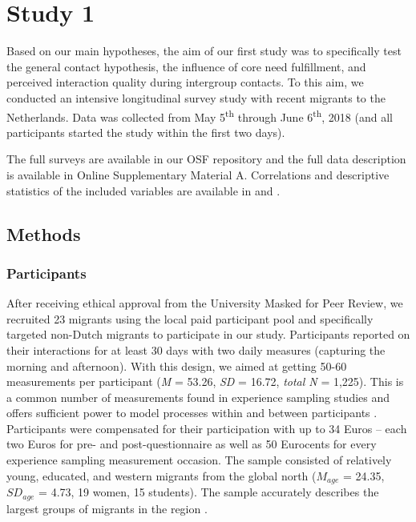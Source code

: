 \section{Study 1}

Based on our main hypotheses, the aim of our first study was to
specifically test the general contact hypothesis, the influence of core
need fulfillment, and perceived interaction quality during intergroup
contacts. To this aim, we conducted an intensive longitudinal survey
study with recent migrants to the Netherlands. Data was collected from
May 5\textsuperscript{th} through June 6\textsuperscript{th}, 2018 (and
all participants started the study within the first two days).

The full surveys are available in our OSF repository
\citep{KreienkampMasked2022a} and the full data description is available
in Online Supplementary Material A. Correlations and descriptive
statistics of the included variables are available in
 and .

\subsection{Methods}

\subsubsection{Participants}

After receiving ethical approval from the University Masked for Peer
Review, we recruited 23 migrants using the local paid participant pool
and specifically targeted non-Dutch migrants to participate in our
study. Participants reported on their interactions for at least 30 days
with two daily measures (capturing the morning and afternoon). With this
design, we aimed at getting 50-60 measurements per participant
(\textit{M} = 53.26, \textit{SD} = 16.72, \textit{total N} = 1,225).
This is a common number of measurements found in experience sampling
studies and offers sufficient power to model processes within and
between participants
\citep[e.g., for a systematic review see][]{AanhetRot2012}. Participants
were compensated for their participation with up to 34 Euros -- each two
Euros for pre- and post-questionnaire as well as 50 Eurocents for every
experience sampling measurement occasion. The sample consisted of
relatively young, educated, and western migrants from the global north
(\(M_{age}\) = 24.35, \(SD_{age}\) = 4.73, 19 women, 15 students). The
sample accurately describes the largest groups of migrants in the region
\citep[][]{GemeenteGroningen2015}.

